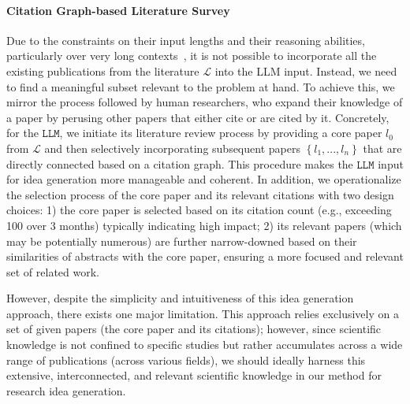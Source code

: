 \paragraph{Citation Graph-based Literature Survey}
Due to the constraints on their input lengths and their reasoning abilities, particularly over very long contexts~\cite{LostITM}, it is not possible to incorporate all the existing publications from the literature $\mathcal{L}$ into the LLM input. Instead, we need to find a meaningful subset relevant to the problem at hand. To achieve this, we mirror the process followed by human researchers, who expand their knowledge of a paper by perusing other papers that either cite or are cited by it. Concretely, for the $\texttt{LLM}$, we initiate its literature review process by providing a core paper $l_0$ from $\mathcal{L}$ and then selectively incorporating subsequent papers $\left\{ l_1, ..., l_n \right\}$ that are directly connected based on a citation graph. This procedure makes the $\texttt{LLM}$ input for idea generation more manageable and coherent. In addition, we operationalize the selection process of the core paper and its relevant citations with two design choices: 1) the core paper is selected based on its citation count (e.g., exceeding 100 over 3 months) typically indicating high impact; 2) its relevant papers (which may be potentially numerous) are further narrow-downed based on their similarities of abstracts with the core paper, ensuring a more focused and relevant set of related work.

However, despite the simplicity and intuitiveness of this idea generation approach, there exists one major limitation. This approach relies exclusively on a set of given papers (the core paper and its citations); however, since scientific knowledge is not confined to specific studies but rather accumulates across a wide range of publications (across various fields), we should ideally harness this extensive, interconnected, and relevant scientific knowledge in our method for research idea generation.

